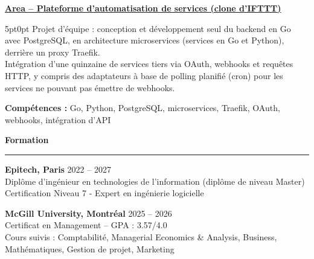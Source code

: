 \documentclass[9pt]{extarticle}
\begin{document}
\par\vspace{8pt}

\underline{\bfseries Area -- Plateforme d'automatisation de services (clone d'IFTTT)}
\par
\begin{adjustwidth}{5pt}{0pt}
    Projet d'équipe : conception et développement seul du backend en Go avec PostgreSQL, en architecture microservices (services en Go et Python), derrière un proxy Traefik. \\
    Intégration d'une quinzaine de services tiers via OAuth, webhooks et requêtes HTTP, y compris des adaptateurs à base de polling planifié (cron) pour les services ne pouvant pas émettre de webhooks.
\end{adjustwidth}
\par
{\bfseries Compétences :} Go, Python, PostgreSQL, microservices, Traefik, OAuth, webhooks, intégration d'API

\par\vspace{8pt}

{\large\bfseries Formation}
\par\vspace{-8pt}
\rule{\linewidth}{0.4pt}
\par\vspace{5pt}

{\bfseries Epitech, Paris} \hfill 2022 -- 2027 \\
Diplôme d'ingénieur en technologies de l'information (diplôme de niveau Master) \\
Certification Niveau 7 - Expert en ingénierie logicielle

\vspace{6pt}

{\bfseries McGill University, Montréal} \hfill 2025 -- 2026 \\
Certificat en Management -- GPA : 3.57/4.0 \\
Cours suivis : Comptabilité, Managerial Economics \& Analysis, Business, Mathématiques, Gestion de projet, Marketing
\end{document}
